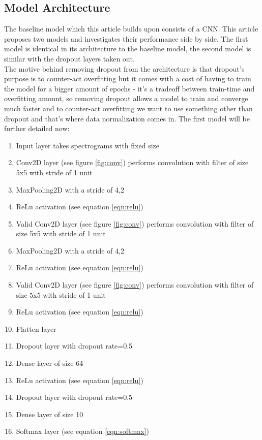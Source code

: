 \documentclass[a4paper]{article}
\begin{document}
\subsection{Model Architecture} \label{ssec:model_architecture}
The baseline model which this article builds upon \cite{baseline} consists of a CNN.
This article proposes two models and investigates their performance side by side.
The first model is identical in its architecture to the baseline model, the second model is similar with the dropout \cite{dropout} layers taken out.\\
The motive behind removing dropout from the architecture is that dropout's purpose is to counter-act overfitting but it comes with a cost of having to train the model for a bigger amount of epochs - it's a tradeoff between train-time and overfitting amount, so removing dropout allows a model to train and converge much faster and to counter-act overfitting we want to use something other than dropout and that's where data normalization comes in.
The first model will be further detailed now:
\begin{enumerate}
    \item Input layer takes spectrograms with fixed size
    \item Conv2D \cite{conv} layer (see figure \ref{fig:conv}) performs convolution with filter of size 5x5 with stride of 1 unit
    \item MaxPooling2D \cite{conv} with a stride of 4,2
    \item ReLu activation \cite{relu} (see equation \ref{eqn:relu})
    \item Valid Conv2D \cite{conv} layer (see figure \ref{fig:conv}) performs convolution with filter of size 5x5 with stride of 1 unit
    \item MaxPooling2D \cite{conv} with a stride of 4,2
    \item ReLu activation \cite{relu} (see equation \ref{eqn:relu})
    \item Valid Conv2D \cite{conv} layer (see figure \ref{fig:conv}) performs convolution with filter of size 5x5 with stride of 1 unit
    \item ReLu activation \cite{relu} (see equation \ref{eqn:relu})
    \item Flatten layer
    \item Dropout layer \cite{dropout} with dropout rate=0.5
    \item Dense layer of size 64
    \item ReLu activation \cite{relu} (see equation \ref{eqn:relu})
    \item Dropout layer \cite{dropout} with dropout rate=0.5
    \item Dense layer of size 10
    \item Softmax layer (see equation \ref{eqn:softmax})
\end{enumerate}
\end{document}
